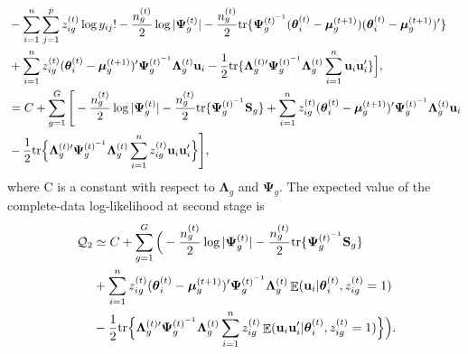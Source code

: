 \documentclass[12pt]{article}
\newcommand{\inv}{^{\raisebox{.2ex}{$\scriptscriptstyle-1$}}}
\DeclareMathOperator{\E}{\mathbb{E}}
\begin{document}
\begin{equation*}
\begin{split}
& - \sum_{i=1}^n \sum_{j=1}^p z_{ig}^{(t)} \log y_{ij}! - \frac{n_g^{(t)}}{2} \log | \mathbf{\Psi}_g^{(t)} | - \frac{n_g^{(t)}}{2} \text{tr} \{\mathbf{\Psi}_g^{(t)  \inv} (\boldsymbol{\theta}_i^{(t)} - \boldsymbol{\mu}_g^{(t+1)}) (\boldsymbol{\theta}_i^{(t)} - \boldsymbol{\mu}_g^{(t+1)})^{\prime} \} \\
&  +\sum_{i=1}^n z_{ig}^{(t)} (\boldsymbol{\theta}_i^{(t)} - \boldsymbol{\mu}_g^{(t+1)})^{\prime} \mathbf{\Psi}_g^{(t)  \inv} \mathbf{\Lambda}_g^{(t)} \mathbf{u}_i - \frac{1}{2} \text{tr} \{\mathbf{\Lambda}_g^{(t) \prime} \mathbf{\Psi}_g^{(t)  \inv} \mathbf{\Lambda}_g^{(t)} \sum_{i=1}^n \mathbf{u}_i \mathbf{u}_i^{\prime} \} \Big], \\
& = C + \sum_{g=1}^G \Bigg[ -\frac{n_g^{(t)}}{2} \log | \mathbf{\Psi}_g^{(t)} | - \frac{n_g^{(t)}}{2}\text{tr} \{\mathbf{\Psi}_g^{(t)  \inv} \mathbf{S}_g \} + \sum_{i=1}^n z_{ig}^{(t)} (\boldsymbol{\theta}_i^{(t)} - \boldsymbol{\mu}_g^{(t+1)})^{\prime} \mathbf{\Psi}_g^{(t) \inv} \mathbf{\Lambda}_g^{(t)} \mathbf{u}_i \\
& - \frac{1}{2} \text{tr} \Big\{ \mathbf{\Lambda}_g^{(t) \prime} \mathbf{\Psi}_g^{(t)  \inv} \mathbf{\Lambda}_g^{(t)} \sum_{i=1}^n z_{ig}^{(t)} \mathbf{u}_i  \mathbf{u}_i^{\prime} \Big\} \Bigg],
\end{split}
\end{equation*}
where C is a constant with respect to $\mathbf{\Lambda}_g$ and $\mathbf{\Psi}_g$. The expected value of the complete-data log-likelihood at second stage is
\begin{equation}
\label{Q2_nonreduced}
\begin{split}
\
\mathcal{Q}_2 & \simeq C + \sum_{g=1}^G \Big( -\frac{n_g^{(t)}}{2} \log | \mathbf{\Psi}_g^{(t)} | - \frac{n_g^{(t)}}{2}\text{tr} \{\mathbf{\Psi}_g^{(t) \inv} \mathbf{S}_g \} \\
& + \sum_{i=1}^n z_{ig}^{(t)} (\boldsymbol{\theta}_i^{(t)} - \boldsymbol{\mu}_g^{(t+1)})^{\prime} \mathbf{\Psi}_g^{(t) \inv} \mathbf{\Lambda}_g^{(t)} \E(\mathbf{u}_i | \boldsymbol{\theta}_i^{(t)}, z_{ig}^{(t)} =1) \\ 
& - \frac{1}{2} \text{tr} \Big\{ \mathbf{\Lambda}_g^{(t) \prime} \mathbf{\Psi}_g^{(t) \inv} \mathbf{\Lambda}_g^{(t)} \sum_{i=1}^n z_{ig}^{(t)} \E(\mathbf{u}_i  \mathbf{u}_i^{\prime} | \boldsymbol{\theta}_i^{(t)}, z_{ig}^{(t)} =1) \Big\} \Big).
\end{split}
\end{equation} 
\end{document}
